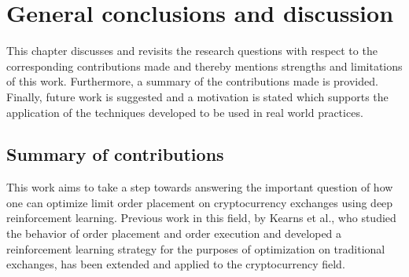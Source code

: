 \chapter{General conclusions and discussion}
\label{chap:discussion}


This chapter discusses and revisits the research questions with respect to the corresponding contributions made and thereby mentions strengths and limitations of this work.
Furthermore, a summary of the contributions made is provided.
Finally, future work is suggested and a motivation is stated which supports the application of the techniques developed to be used in real world practices.

\section{Summary of contributions}

This work aims to take a step towards answering the important question of how one can optimize limit order placement on cryptocurrency exchanges using deep reinforcement learning.
Previous work in this field, by Kearns et al., who studied the behavior of order placement and order execution\cite{nevmyvaka2005electronic} and developed a reinforcement learning strategy\cite{nevmyvaka2006reinforcement} for the purposes of optimization on traditional exchanges, has been extended and applied to the cryptocurrency field.

